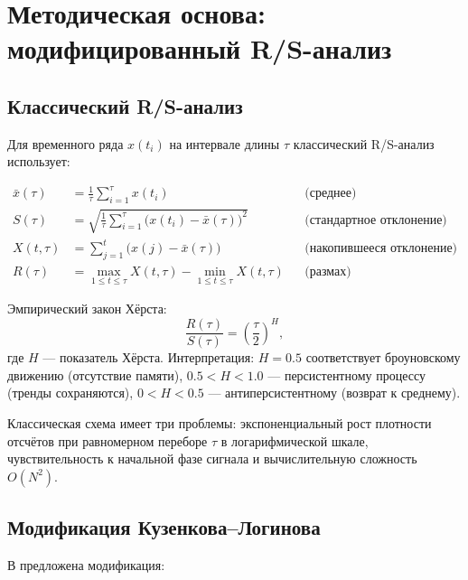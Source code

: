 \documentclass[12pt,a4paper]{article}
\begin{document}
\section{Методическая основа: модифицированный R/S-анализ}
\label{sec:method}

\subsection{Классический R/S-анализ}

Для временного ряда $x(t_i)$ на интервале длины $\tau$ классический
R/S-анализ использует:

\begin{align}
\bar{x}(\tau) &= \frac{1}{\tau}\sum_{i=1}^{\tau} x(t_i)
  && \text{(среднее)} \\
S(\tau) &= \sqrt{\frac{1}{\tau}\sum_{i=1}^{\tau}\big(x(t_i)-\bar{x}(\tau)\big)^2}
  && \text{(стандартное отклонение)} \\
X(t,\tau) &= \sum_{j=1}^{t}\big(x(j)-\bar{x}(\tau)\big)
  && \text{(накопившееся отклонение)} \\
R(\tau) &= \max_{1\le t\le \tau} X(t,\tau) - \min_{1\le t \le \tau} X(t,\tau)
  && \text{(размах)}
\end{align}

Эмпирический закон Хёрста:
\begin{equation}
\frac{R(\tau)}{S(\tau)} = \left(\frac{\tau}{2}\right)^{H},
\label{eq:hurst-law}
\end{equation}
где $H$ — показатель Хёрста. Интерпретация: $H=0.5$ соответствует
броуновскому движению (отсутствие памяти), $0.5<H<1.0$ — персистентному
процессу (тренды сохраняются), $0<H<0.5$ — антиперсистентному (возврат
к среднему).

Классическая схема имеет три проблемы: экспоненциальный рост плотности
отсчётов при равномерном переборе $\tau$ в логарифмической шкале,
чувствительность к начальной фазе сигнала и вычислительную сложность
$O(N^2)$.

\subsection{Модификация Кузенкова--Логинова}

В \cite{kuzenkov2014} предложена модификация:
\end{document}
